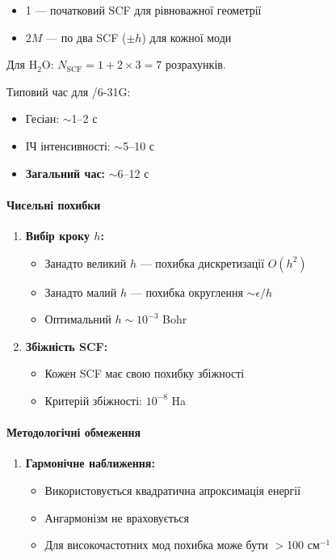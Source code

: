 {\begin{itemize}
    \item 1 --- початковий SCF для рівноважної геометрії
    \item $2M$ --- по два SCF ($\pm h$) для кожної моди
\end{itemize}

Для H$_2$O: $N_{\text{SCF}} = 1 + 2 \times 3 = 7$ розрахунків.

Типовий час для /6-31G:
\begin{itemize}
    \item Гесіан: $\sim$1--2 с
    \item ІЧ інтенсивності: $\sim$5--10 с
    \item \textbf{Загальний час:} $\sim$6--12 с
\end{itemize}


\paragraph{Чисельні похибки}

\begin{enumerate}
    \item \textbf{Вибір кроку $h$:}
    \begin{itemize}
        \item Занадто великий $h$ --- похибка дискретизації $O(h^2)$
        \item Занадто малий $h$ --- похибка округлення $\sim \epsilon/h$
        \item Оптимальний $h \sim 10^{-3}$ Bohr
    \end{itemize}

    \item \textbf{Збіжність SCF:}
    \begin{itemize}
        \item Кожен SCF має свою похибку збіжності
        \item Критерій збіжності: $10^{-8}$ Ha
    \end{itemize}
\end{enumerate}

\paragraph{Методологічні обмеження}

\begin{enumerate}
    \item \textbf{Гармонічне наближення:}
    \begin{itemize}
        \item Використовується квадратична апроксимація енергії
        \item Ангармонізм не враховується
        \item Для високочастотних мод похибка може бути $>$100 см$^{-1}$
    \end{itemize}


\end{enumerate}}
